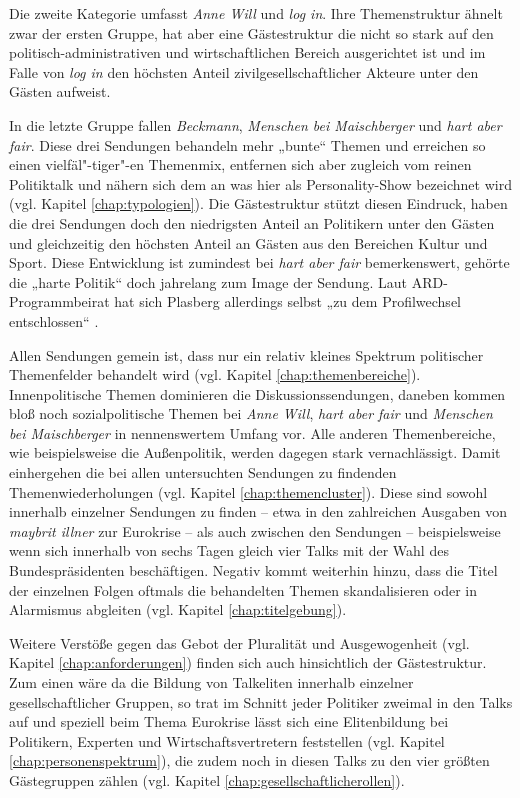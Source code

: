 Die zweite Kategorie umfasst \textit{Anne Will} und \textit{log in}. Ihre Themenstruktur ähnelt zwar der ersten Gruppe, hat aber eine Gästestruktur die nicht so stark auf den politisch-administrativen und wirtschaftlichen Bereich ausgerichtet ist und im Falle von \textit{log in} den höchsten Anteil zivilgesellschaftlicher Akteure unter den Gästen aufweist.

In die letzte Gruppe fallen \textit{Beckmann}, \textit{Menschen bei Maischberger} und \textit{hart aber fair}. Diese drei Sendungen behandeln mehr „bunte“ Themen und erreichen so einen vielfäl"-tiger"-en Themenmix, entfernen sich aber zugleich vom reinen Politiktalk und nähern sich dem an was hier als Personality-Show bezeichnet wird (vgl. Kapitel \vref{chap:typologien}). Die Gästestruktur stützt diesen Eindruck, haben die drei Sendungen doch den niedrigsten Anteil an Politikern unter den Gästen und gleichzeitig den höchsten Anteil an Gästen aus den Bereichen Kultur und Sport. Diese Entwicklung ist zumindest bei \textit{hart aber fair} bemerkenswert, gehörte die „harte Politik“ doch jahrelang zum Image der Sendung. Laut ARD-Programmbeirat hat sich Plasberg allerdings selbst „zu dem Profilwechsel entschlossen“ \parencite{ard-programmbeiratTalkformateImErsten2012}.

Allen Sendungen gemein ist, dass nur ein relativ kleines Spektrum politischer Themenfelder behandelt wird (vgl. Kapitel \vref{chap:themenbereiche}). Innenpolitische Themen dominieren die Diskussionssendungen, daneben kommen bloß noch sozialpolitische Themen bei \textit{Anne Will}, \textit{hart aber fair} und \textit{Menschen bei Maischberger} in nennenswertem Umfang vor. Alle anderen Themenbereiche, wie beispielsweise die Außenpolitik, werden dagegen stark vernachlässigt. Damit einhergehen die bei allen untersuchten Sendungen zu findenden Themenwiederholungen (vgl. Kapitel \vref{chap:themencluster}). Diese sind sowohl innerhalb einzelner Sendungen zu finden – etwa in den zahlreichen Ausgaben von \textit{maybrit illner} zur Eurokrise – als auch zwischen den Sendungen – beispielsweise wenn sich innerhalb von sechs Tagen gleich vier Talks mit der Wahl des Bundespräsidenten beschäftigen. Negativ kommt weiterhin hinzu, dass die Titel der einzelnen Folgen oftmals die behandelten Themen skandalisieren oder in Alarmismus abgleiten (vgl. Kapitel \vref{chap:titelgebung}).

Weitere Verstöße gegen das Gebot der Pluralität und Ausgewogenheit (vgl. Kapitel \vref{chap:anforderungen}) finden sich auch hinsichtlich der Gästestruktur. Zum einen wäre da die Bildung von Talkeliten innerhalb einzelner gesellschaftlicher Gruppen, so trat im Schnitt jeder Politiker zweimal in den Talks auf und speziell beim Thema Eurokrise lässt sich eine Elitenbildung bei Politikern, Experten und Wirtschaftsvertretern feststellen (vgl. Kapitel \vref{chap:personenspektrum}), die zudem noch in diesen Talks zu den vier größten Gästegruppen zählen (vgl. Kapitel \vref{chap:gesellschaftlicherollen}).

